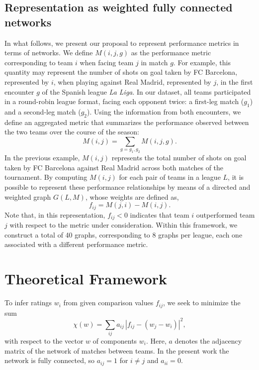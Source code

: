 \documentclass[preprint,12pt]{elsarticle}
\begin{document}
\subsection{Representation as weighted fully connected networks}

In what follows, we present our proposal to represent performance metrics in terms of networks.  
We define $M(i,j,g)$ as the performance metric corresponding to team $i$ when facing team $j$ in match $g$. For example, this quantity may represent the number of shots on goal taken by FC Barcelona, represented by $i$, when playing against Real Madrid, represented by $j$, in the first encounter $g$ of the Spanish league {\it La Liga}.  
%
In our dataset, all teams participated in a round-robin league format, facing each opponent twice: a first-leg match ($g_1$) and a second-leg match ($g_2$). Using the information from both encounters, we define an aggregated metric that summarizes the performance observed between the two teams over the course of the season:
%
\begin{equation} \label{eq:1}
M(i,j) = \sum_{g= g_1, g_2} M(i,j,g).
\end{equation}
%
In the previous example, $M(i,j)$ represents the total number of shots on goal taken by FC Barcelona against Real Madrid across both matches of the tournament.
%
By computing $M(i,j)$ for each pair of teams in a league $L$, it is possible to represent these performance relationships by means of a directed and weighted graph $G(L,M)$, whose weights are defined as,
%
\begin{equation}
f_{ij} = M(j,i) - M(i,j).
\end{equation}
%
Note that, in this representation, $f_{ij} < 0$ indicates that team $i$ outperformed team $j$ with respect to the metric under consideration.
%
Within this framework, we construct a total of 40 graphs, corresponding to 8 graphs per league, each one associated with a different performance metric.




\section{Theoretical Framework}
\label{se:theory}

To infer ratings $w_i$ from given comparison values $f_{ij}$, we seek to minimize the sum
%
\begin{equation}
\chi(w)
=
\sum_{ij}
a_{ij}\,
|f_{ij}-(w_j-w_i)|^2,
\end{equation}
%
with respect to the vector $w$ of components $w_i$.
Here, $a$ denotes the adjacency matrix of the network of matches between teams.
In the present work the network is fully connected, so $a_{ij}=1$ for $i\neq j$ and $a_{ii}=0$.
\end{document}
